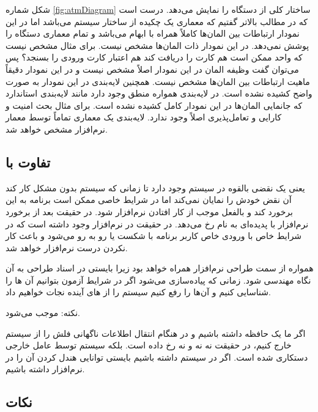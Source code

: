شکل شماره \ref{fig:atmDiagram} ساختار کلی از دستگاه  را نمایش می‌دهد.
درست است که در مطالب بالاتر گفتیم که معماری یک چکیده از ساختار سیستم می‌باشد اما
در این نمودار ارتباطات بین المان‌ها کاملاً همراه با ابهام می‌باشد و تمام معماری
دستگاه  را پوشش نمی‌دهد. در این نمودار ذات المان‌ها مشخص نیست. برای مثال
مشخص نیست که واحد  ممکن است هم کارت را دریافت کند هم اعتبار
کارت ورودی را بسنجد؟ پس می‌توان گفت وظیفه المان  در این
نمودار اصلاً مشخص نیست و در این نمودار دقیقاً ماهیت ارتباطات بین المان‌ها مشخص
نیست. همچنین لایه‌بندی در این نمودار به صورت واضح کشیده نشده است. در لایه‌بندی
همواره منطق وجود دارد مانند لایه‌بندی استاندارد  که جانمایی المان‌ها در
این نمودار کامل کشیده نشده است. برای مثال بحث امنیت و کارایی و تعامل‌پذیری اصلاً
وجود ندارد. لایه‌بندی یک معماری تماماً توسط معمار نرم‌افزار مشخص خواهد شد.

\subsection{تفاوت  با }

 یعنی یک نقضی بالقوه در سیستم وجود دارد تا زمانی که سیستم بدون مشکل
کار کند آن نقض خودش را نمایان نمی‌کند اما در شرایط خاصی ممکن است برنامه به این
 برخورد کند و بالفعل موجب از کار افتادن نرم‌افزار شود. در حقیقت بعد از
برخورد نرم‌افزار با  پدیده‌ای به نام  رخ می‌دهد. در حقیقت
 در نرم‌افزار وجود داشته است که در شرایط خاص با ورودی خاص کاربر برنامه
با شکست یا  رو به رو می‌شود و باعث کار نکردن درست نرم‌افزار خواهد
شد.

همواره  از سمت طراحی نرم‌افزار همراه خواهد بود زیرا بایستی در اسناد
طراحی به آن نگاه مهندسی شود. زمانی که پیاده‌سازی می‌شود اگر در شرایط آزمون
بتوانیم آن ها را شناسایی کنیم و آن‌ها را رفع کنیم سیستم را از
های آینده نجات خواهیم داد.

نکته:  موجب  می‌شود.

اگر ما یک حافظه  داشته باشیم و در هنگام انتقال اطلاعات ناگهانی فلش را از
سیستم خارج کنیم، در حقیقت نه  نه  و نه  رخ داده
است. بلکه سیستم توسط عامل خارجی دستکاری شده است. اگر  در سیستم داشته
باشیم بایستی توانایی هندل کردن آن را در نرم‌افزار داشته باشیم.

\subsection*{نکات}

